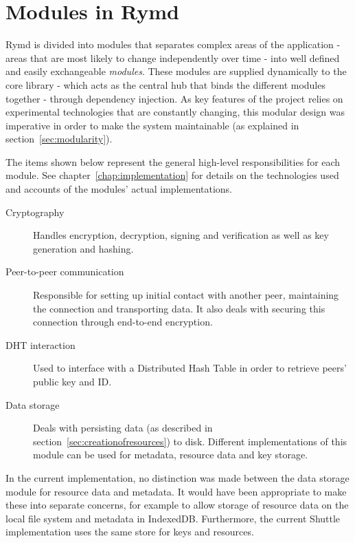\section{Modules in Rymd}
\label{sec:modules}


Rymd is divided into modules that separates complex areas of the application - areas that are most likely to change independently over time - into well defined and easily exchangeable \emph{modules}. These modules are supplied dynamically to the core library - which acts as the central hub that binds the different modules together - through dependency injection. As key features of the project relies on experimental technologies that are constantly changing, this modular design was imperative in order to make the system maintainable (as explained in section~\ref{sec:modularity}).

The items shown below represent the general high-level responsibilities for each module. See chapter~\ref{chap:implementation} for details on the technologies used and accounts of the modules' actual implementations.

\begin{description}
  \item [Cryptography] Handles encryption, decryption, signing and verification as well as key generation and hashing.
  \item [Peer-to-peer communication] Responsible for setting up initial contact with another peer, maintaining the connection and transporting data. It also deals with securing this connection through end-to-end encryption.
  \item [DHT interaction] Used to interface with a Distributed Hash Table in order to retrieve peers' public key and ID.
  \item [Data storage] Deals with persisting data (as described in section~\ref{sec:creationofresources}) to disk. Different implementations of this module can be used for metadata, resource data and key storage.
\end{description}

In the current implementation, no distinction was made between the data storage module for resource data and metadata. It would have been appropriate to make these into separate concerns, for example to allow storage of resource data on the local file system and metadata in IndexedDB. Furthermore, the current Shuttle implementation uses the same store for keys and resources.
